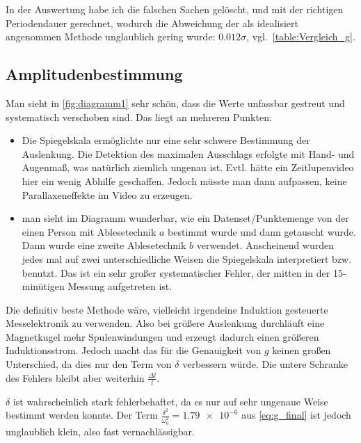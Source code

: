 In der Auswertung habe ich die falschen Sachen gelöscht, und mit der richtigen Periodendauer gerechnet, wodurch die Abweichung der als idealisiert angenommen Methode unglaublich gering wurde: \(0.012\sigma\), vgl.\ \cref{table:Vergleich_g}. 


\subsection{Amplitudenbestimmung}
Man sieht in \cref{fig:diagramm1} sehr schön, dass die Werte unfassbar gestreut und systematisch verschoben sind. Das liegt an mehreren Punkten:
\begin{itemize}
    \item Die Spiegelskala ermöglichte nur eine sehr schwere Bestimmung der Auslenkung. Die Detektion des maximalen Ausschlags erfolgte mit Hand- und Augenmaß, was natürlich ziemlich ungenau ist. Evtl. hätte ein Zeitlupenvideo hier ein wenig Abhilfe geschaffen. Jedoch müsste man dann aufpassen, keine Parallaxeneffekte im Video zu erzeugen.
    \item man sieht im Diagramm wunderbar, wie ein Datenset/Punktemenge von der einen Person mit Ablesetechnik \(a\) bestimmt wurde und dann getauscht wurde. Dann wurde eine zweite Ablesetechnik \(b\) verwendet. Anscheinend wurden jedes mal auf zwei unterschiedliche Weisen die Spiegelskala interpretiert bzw. benutzt. Das ist ein sehr großer systematischer Fehler, der mitten in der 15-minütigen Messung aufgetreten ist. 
\end{itemize}
Die definitiv beste Methode wäre, vielleicht irgendeine Induktion gesteuerte Messelektronik zu verwenden. Also bei größere Auslenkung durchläuft eine Magnetkugel mehr Spulenwindungen und erzeugt dadurch einen größeren Induktionsstrom. Jedoch macht das für die Genauigkeit von \(g\) keinen großen Unterschied, da dies nur den Term von \(\delta\) verbessern würde. Die untere Schranke des Fehlers bleibt aber weiterhin \(\frac{\Delta l}{l}\).

\(\delta\) ist wahrscheinlich stark fehlerbehaftet, da es nur auf sehr ungenaue Weise bestimmt werden konnte. Der Term \(\frac{\delta^2}{\omega_0^2}=\num{1.79e-6}\) aus \cref{eq:g_final} ist jedoch unglaublich klein, also fast vernachlässigbar.

